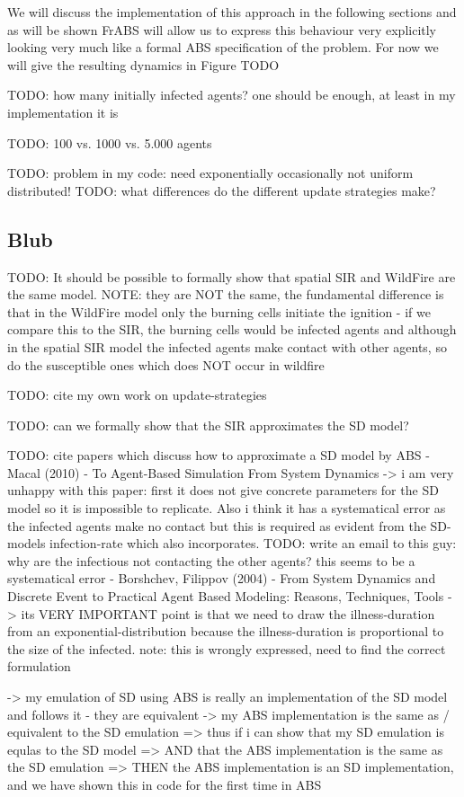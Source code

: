 We will discuss the implementation of this approach in the following sections and as will be shown FrABS will allow us to express this behaviour very explicitly looking very much like a formal ABS specification of the problem. For now we will give the resulting dynamics in Figure TODO

TODO: how many initially infected agents? one should be enough, at least in my implementation it is

TODO: 100 vs. 1000 vs. 5.000 agents

TODO: problem in my code: need exponentially occasionally not uniform distributed!
TODO: what differences do the different update strategies make?

\subsection{Blub}
TODO: It should be possible to formally show that spatial SIR and WildFire are the same model. NOTE: they are NOT the same, the fundamental difference is that in the WildFire model only the burning cells initiate the ignition - if we compare this to the SIR, the burning cells would be infected agents and although in the spatial SIR model the infected agents make contact with other agents, so do the susceptible ones which does NOT occur in wildfire

TODO: cite my own work on update-strategies

TODO: can we formally show that the SIR approximates the SD model?

TODO: cite papers which discuss how to approximate a SD model by ABS
- Macal (2010) - To Agent-Based Simulation From System Dynamics 
	-> i am very unhappy with this paper: first it does not give concrete parameters for the SD model so it is impossible to replicate. Also i think it has a systematical error as the infected agents make no contact but this is required as evident from the SD-models infection-rate which also incorporates. TODO: write an email to this guy: why are the infectious not contacting the other agents? this seems to be a systematical error
- Borshchev, Filippov (2004) - From System Dynamics and Discrete Event to Practical Agent Based Modeling: Reasons, Techniques, Tools
	-> its VERY IMPORTANT point is that we need to draw the illness-duration from an exponential-distribution because the illness-duration is proportional to the size of the infected. note: this is wrongly expressed, need to find the correct formulation

		-> my emulation of SD using ABS is really an implementation of the SD model and follows it - they are equivalent
		-> my ABS implementation is the same as / equivalent to the SD emulation
			=> thus if i can show that my SD emulation is equlas to the SD model
			=> AND that the ABS implementation is the same as the SD emulation
			=> THEN the ABS implementation is an SD implementation, and we have shown this in code for the first time in ABS
			
